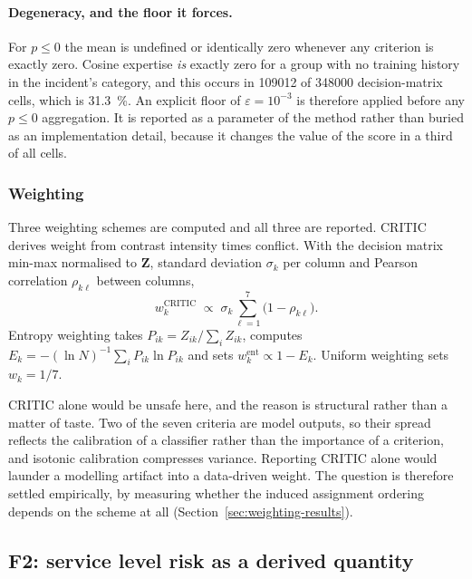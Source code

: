 \paragraph{Degeneracy, and the floor it forces.} For $p \le 0$ the mean is undefined or
identically zero whenever any criterion is exactly zero. Cosine expertise \emph{is} exactly
zero for a group with no training history in the incident's category, and this occurs in
\num{109012} of \num{348000} decision-matrix cells, which is \SI{31.3}{\percent}. An explicit floor
of $\varepsilon = 10^{-3}$ is therefore applied before any $p \le 0$ aggregation. It is reported
as a parameter of the method rather than buried as an implementation detail, because it changes
the value of the score in a third of all cells.

\subsubsection{Weighting}

Three weighting schemes are computed and all three are reported. CRITIC
\citep{diakoulaki1995determining} derives weight from contrast intensity times conflict. With
the decision matrix min-max normalised to $\mathbf{Z}$, standard deviation $\sigma_k$ per
column and Pearson correlation $\rho_{k\ell}$ between columns,
\begin{equation}
w^{\mathrm{CRITIC}}_k \;\propto\; \sigma_k \sum_{\ell=1}^{7} \bigl(1 - \rho_{k\ell}\bigr).
\label{eq:critic}
\end{equation}
Entropy weighting takes $P_{ik} = Z_{ik} / \sum_i Z_{ik}$, computes
$E_k = -\left(\ln N\right)^{-1}\sum_i P_{ik} \ln P_{ik}$ and sets
$w^{\mathrm{ent}}_k \propto 1 - E_k$. Uniform weighting sets $w_k = 1/7$.

CRITIC alone would be unsafe here, and the reason is structural rather than a matter of taste.
Two of the seven criteria are model outputs, so their spread reflects the calibration of a
classifier rather than the importance of a criterion, and isotonic calibration compresses
variance. Reporting CRITIC alone would launder a modelling artifact into a data-driven weight.
The question is therefore settled empirically, by measuring whether the induced assignment
ordering depends on the scheme at all (Section~\ref{sec:weighting-results}).

\subsection{F2: service level risk as a derived quantity}
\label{sec:f2}

